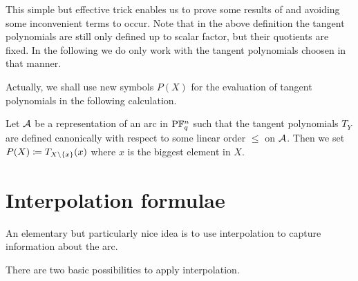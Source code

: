     This simple but effective trick enables us to prove some results of  and  avoiding some inconvenient terms to occur.
    Note that in the above definition the tangent polynomials are still only defined up to scalar factor, but their quotients are fixed.
    In the following we do only work with the tangent polynomials choosen in that manner.

    Actually, we shall use new symbols $P(X)$ for the evaluation of tangent polynomials in the following calculation.

\begin{definition}\label{tang-pol-eval}
    Let $\mathcal{A}$ be a representation of an arc in $\P \field{q}^n$ such that the tangent polynomials $T_Y$ are defined canonically with respect to some linear order $\leq$ on $\mathcal{A}$. Then we set $P(X)\defeq T_{X\setminus\set{x}}(x)$ where $x$ is the biggest element in  $X$.
\end{definition}

\section{Interpolation formulae}

An elementary but particularly nice idea is to use interpolation to capture information about the arc.

There are two basic possibilities to apply interpolation. 

